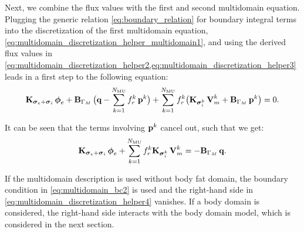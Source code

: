 Next, we combine the flux values with the first and second multidomain equation.
Plugging the generic relation \cref{eq:boundary_relation} for boundary integral terms into the discretization of the first multidomain equation, \cref{eq:multidomain_discretization_helper_multidomain1}, and using the derived flux values in \cref{eq:multidomain_discretization_helper2,eq:multidomain_discretization_helper3} leads in a first step to the following equation:
\begin{align*}
  \textbf{K}_{\boldsymbol{\sigma}_e + \boldsymbol{\sigma}_i}\,\boldsymbol{\phi}_{e} + \textbf{B}_{\Gamma_M}\,\big(\textbf{q} - \displaystyle\sum\limits_{k=1}^{N_\text{MU}} f_r^k\,\textbf{p}^k\big) +  \displaystyle\sum\limits_{k=1}^{N_\text{MU}} f_r^k \big(\textbf{K}_{\boldsymbol{\sigma}_i^k}\,\textbf{V}_m^k + \textbf{B}_{\Gamma_M}\,\textbf{p}^k\big) = 0.  
\end{align*}

It can be seen that the terms involving $\textbf{p}^k$ cancel out, such that we get:
\begin{align}\label{eq:multidomain_discretization_helper4}
    \textbf{K}_{\boldsymbol{\sigma}_e + \boldsymbol{\sigma}_i}\,\boldsymbol{\phi}_{e} + \displaystyle\sum\limits_{k=1}^{N_\text{MU}} f_r^k \textbf{K}_{\boldsymbol{\sigma}_i^k}\,\textbf{V}_m^k = -\textbf{B}_{\Gamma_M}\,\textbf{q}.
\end{align}

If the multidomain description is used without body fat domain, the boundary condition in \cref{eq:multidomain_bc2} is used and the right-hand side in \cref{eq:multidomain_discretization_helper4} vanishes. If a body domain is considered, the right-hand side interacts with the body domain model, which is considered in the next section.

